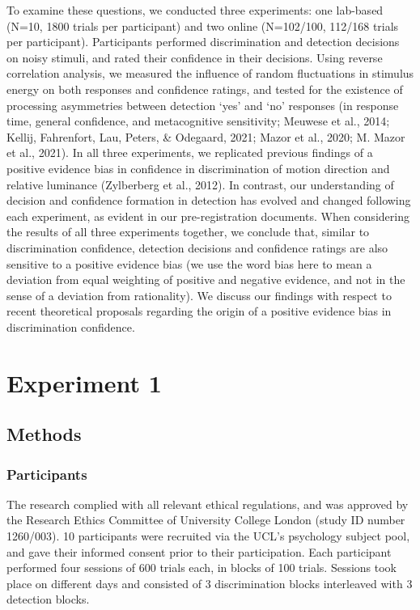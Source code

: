 \documentclass[12pt,twoside]{reedthesis}
\begin{document}
To examine these questions, we conducted three experiments: one lab-based (N=10, 1800 trials per participant) and two online (N=102/100, 112/168 trials per participant). Participants performed discrimination and detection decisions on noisy stimuli, and rated their confidence in their decisions. Using reverse correlation analysis, we measured the influence of random fluctuations in stimulus energy on both responses and confidence ratings, and tested for the existence of processing asymmetries between detection `yes' and `no' responses (in response time, general confidence, and metacognitive sensitivity; Meuwese et al., 2014; Kellij, Fahrenfort, Lau, Peters, \& Odegaard, 2021; Mazor et al., 2020; M. Mazor et al., 2021). In all three experiments, we replicated previous findings of a positive evidence bias in confidence in discrimination of motion direction and relative luminance (Zylberberg et al., 2012). In contrast, our understanding of decision and confidence formation in detection has evolved and changed following each experiment, as evident in our pre-registration documents. When considering the results of all three experiments together, we conclude that, similar to discrimination confidence, detection decisions and confidence ratings are also sensitive to a positive evidence bias (we use the word bias here to mean a deviation from equal weighting of positive and negative evidence, and not in the sense of a deviation from rationality). We discuss our findings with respect to recent theoretical proposals regarding the origin of a positive evidence bias in discrimination confidence.

\hypertarget{experiment-1-1}{%
\section{Experiment 1}\label{experiment-1-1}}

\hypertarget{methods}{%
\subsection{Methods}\label{methods}}

\hypertarget{participants-4}{%
\subsubsection{Participants}\label{participants-4}}

The research complied with all relevant ethical regulations, and was approved by the Research Ethics Committee of University College London (study ID number 1260/003). 10 participants were recruited via the UCL's psychology subject pool, and gave their informed consent prior to their participation. Each participant performed four sessions of 600 trials each, in blocks of 100 trials. Sessions took place on different days and consisted of 3 discrimination blocks interleaved with 3 detection blocks.
\end{document}
